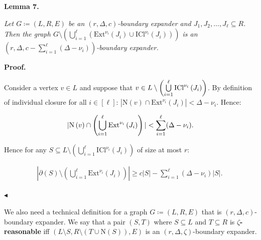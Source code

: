 \documentclass[10pt,a4paper]{article}
\begin{document}


\par\medskip\noindent\textbf{
\textbf{Lemma 7}\textbf{.}
}\par



\emph{Let $G\coloneqq(L,R,E)$ be an $(r,\Delta,c)$-boundary expander and $J_{1},J_{2},\dots,J_{\ell}\subseteq R$. Then the graph $G\setminus\left(\bigcup\limits_{i=1}^{\ell}(\mathrm{Ext}^{\nu_{i}}\left(J_{i}%
\right)\cup\mathrm{ICl}^{\nu_{i}}\left(J_{i}\right))\right)$ is an $(r,\Delta,c-\sum\limits_{i=1}^{\ell}(\Delta-\nu_{i}))$-boundary expander.}\par







\par\medskip\noindent\textbf{Proof.}\par




Consider a vertex $v\in L$ and suppose that $v\in L\setminus\left(\bigcup\limits_{i=1}^{\ell}\mathrm{ICl}^{\nu_{i}}\left(J_%
{i}\right)\right)$. By definition of individual closure for all $i\in[\ell]$: $|\mathrm{N}\left(v\right)\cap\mathrm{Ext}^{\nu_{i}}\left(J_{i}\right)|<\Delta-%
\nu_{i}$. Hence:\par


\[\begin{gathered}
|\mathrm{N}\left(v\right)\cap\left(\bigcup\limits_{i=1}^{\ell}\mathrm{Ext}^{%
\nu_{i}}\left(J_{i}\right)\right)|<\sum\limits_{i=1}^{\ell}(\Delta-\nu_{i}).
\end{gathered}\]


Hence for any $S\subseteq L\setminus\left(\bigcup\limits_{i=1}^{\ell}\mathrm{ICl}^{\nu_{i}}%
\left(J_{i}\right)\right)$ of size at most $r$:\par


\[\begin{gathered}
|\partial(S)\setminus\left(\bigcup\limits_{i=1}^{\ell}\mathrm{Ext}^{\nu_{i}}%
\left(J_{i}\right)\right)|\geq c|S|-\sum\limits_{i=1}^{\ell}(\Delta-\nu_{i})|S%
|.\
\end{gathered}\]


$\blacktriangleleft$\par




We also need a technical definition for a graph $G\coloneqq(L,R,E)$ that is $(r,\Delta,c)$-boundary
expander. We say that a pair $(S,T)$ where $S\subseteq L$ and $T\subseteq R$ is
$\zeta$\textbf{-reasonable} iff $(L\setminus S,R\setminus(T\cup\mathrm{N}\left(S\right)),E)$ is an $(r,\Delta,\zeta)$-boundary expander.\par
\end{document}
